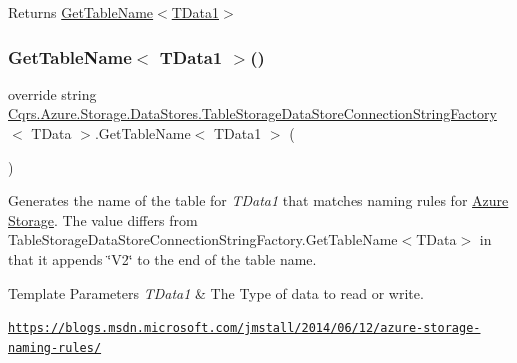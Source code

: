 \begin{DoxyReturn}{Returns}
\hyperlink{classCqrs_1_1Azure_1_1Storage_1_1DataStores_1_1TableStorageDataStoreConnectionStringFactory_a386df8c514b08c9c39583ea9e9a9abe6_a386df8c514b08c9c39583ea9e9a9abe6}{Get\+Table\+Name$<$\+T\+Data1$>$}
\end{DoxyReturn}
\mbox{\label{classCqrs_1_1Azure_1_1Storage_1_1DataStores_1_1TableStorageDataStoreConnectionStringFactory_a386df8c514b08c9c39583ea9e9a9abe6_a386df8c514b08c9c39583ea9e9a9abe6}} 
\subsubsection{\texorpdfstring{Get\+Table\+Name$<$ T\+Data1 $>$()}{GetTableName< TData1 >()}}
{\footnotesize\ttfamily override string \hyperlink{classCqrs_1_1Azure_1_1Storage_1_1DataStores_1_1TableStorageDataStoreConnectionStringFactory}{Cqrs.\+Azure.\+Storage.\+Data\+Stores.\+Table\+Storage\+Data\+Store\+Connection\+String\+Factory}$<$ T\+Data $>$.Get\+Table\+Name$<$ T\+Data1 $>$ (\begin{DoxyParamCaption}{ }\end{DoxyParamCaption})}



Generates the name of the table for {\itshape T\+Data1}  that matches naming rules for \hyperlink{namespaceCqrs_1_1Azure}{Azure} \hyperlink{namespaceCqrs_1_1Azure_1_1Storage}{Storage}. The value differs from Table\+Storage\+Data\+Store\+Connection\+String\+Factory.\+Get\+Table\+Name$<$\+T\+Data$>$ in that it appends \char`\"{}\+V2\char`\"{} to the end of the table name. 


\begin{DoxyTemplParams}{Template Parameters}
{\em T\+Data1} & The Type of data to read or write.\\
\hline
\end{DoxyTemplParams}


\href{https://blogs.msdn.microsoft.com/jmstall/2014/06/12/azure-storage-naming-rules/}{\tt https\+://blogs.\+msdn.\+microsoft.\+com/jmstall/2014/06/12/azure-\/storage-\/naming-\/rules/}